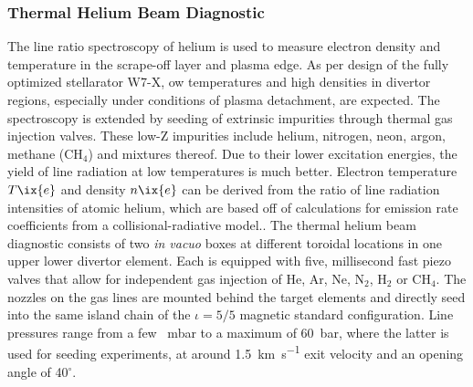         \subsubsection*{Thermal Helium Beam Diagnostic}%
%
            The line ratio spectroscopy of helium is used to measure electron density and temperature in the scrape-off layer and plasma edge. As per design of the fully optimized stellarator W7-X,  ow temperatures and high densities in divertor regions, especially under conditions of plasma detachment, are expected. The spectroscopy is extended by seeding of extrinsic impurities through thermal gas injection valves. These low-Z impurities include helium, nitrogen, neon, argon, methane (CH$_{4}$) and mixtures thereof. Due to their lower excitation energies, the yield of line radiation at low temperatures is much better\cite{Barbui2016}. Electron temperature $T\ix{e}$ and density $n\ix{e}$ can be derived from the ratio of line radiation intensities of atomic helium, which are based off of calculations for emission rate coefficients from a collisional-radiative model.\cite{Denkelmann1999,Krychowiak2011}. The thermal helium beam diagnostic consists of two \textit{in vacuo} boxes at different toroidal locations in one upper lower divertor element. Each is equipped with five, millisecond fast piezo valves that allow for independent gas injection of He, Ar, Ne, N$_{2}$, H$_{2}$ or CH$_{4}$. The nozzles on the gas lines are mounted behind the target elements and directly seed into the same island chain of the $\iota=5/5$ magnetic standard configuration. Line pressures range from a few \SI{}{\milli\bar} to a maximum of \SI{60}{\bar}, where the latter is used for seeding experiments, at around \SI{1.5}{\kilo\meter\per\second} exit velocity and an opening angle of 40$^{\circ}$.\cite{Krychowiak2011,Barbui2016}\\%
%
